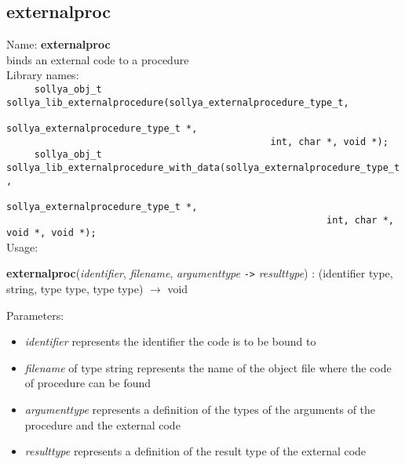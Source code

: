 \subsection{externalproc}
\label{labexternalproc}
\noindent Name: \textbf{externalproc}\\
\phantom{aaa}binds an external code to a \sollya procedure\\[0.2cm]
\noindent Library names:\\
\verb|     sollya_obj_t sollya_lib_externalprocedure(sollya_externalprocedure_type_t, |\\
\verb|                                               sollya_externalprocedure_type_t *,|\\
\verb|                                               int, char *, void *);|\\
\verb|     sollya_obj_t sollya_lib_externalprocedure_with_data(sollya_externalprocedure_type_t, |\\
\verb|                                                         sollya_externalprocedure_type_t *,|\\
\verb|                                                         int, char *, void *, void *);|\\[0.2cm]
\noindent Usage: 
\begin{center}
\textbf{externalproc}(\emph{identifier}, \emph{filename}, \emph{argumenttype} \texttt{->} \emph{resulttype}) : (\textsf{identifier type}, \textsf{string}, \textsf{type type}, \textsf{type type}) $\rightarrow$ \textsf{void}\\
\end{center}
Parameters: 
\begin{itemize}
\item \emph{identifier} represents the identifier the code is to be bound to
\item \emph{filename} of type \textsf{string} represents the name of the object file where the code of procedure can be found
\item \emph{argumenttype} represents a definition of the types of the arguments of the \sollya procedure and the external code
\item \emph{resulttype} represents a definition of the result type of the external code
\end{itemize}
